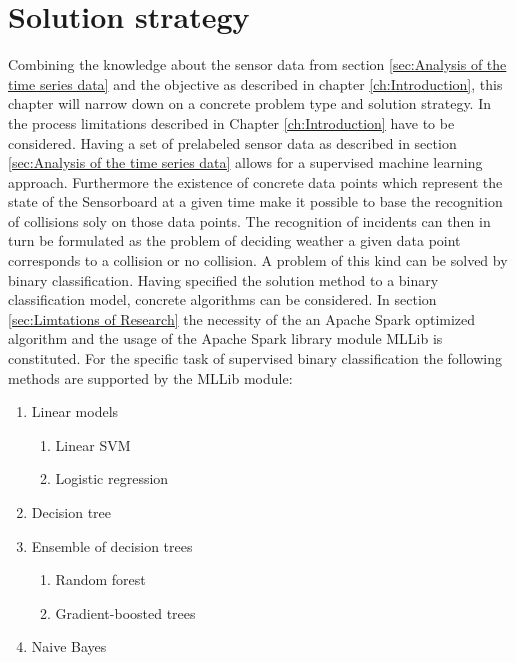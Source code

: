\section{Solution strategy}
\label{sec:Solution strategy}
Combining the knowledge about the sensor data from section \ref{sec:Analysis of the time series data} and the objective as described in chapter \ref{ch:Introduction}, this chapter will narrow down on a concrete problem type and solution strategy. In the process limitations described in Chapter \ref{ch:Introduction} have to be considered. \newline
Having a set of prelabeled sensor data as described in section \ref{sec:Analysis of the time series data} allows for a supervised machine learning approach.  Furthermore the existence of concrete data points which represent the state of the Sensorboard at a given time make it possible to base the recognition of collisions soly on those data points. The recognition of incidents can then in turn be formulated as the problem of deciding weather a given data point corresponds to a collision or no collision. A problem of this kind can be solved by binary classification. \newline
Having specified the solution method to a binary classification model, concrete algorithms can be considered. In section \ref{sec:Limtations of Research}  the necessity of the an Apache Spark optimized algorithm and the usage of the Apache Spark library module MLLib is constituted. For the specific task of supervised binary classification the following methods are supported by the MLLib module:
\begin{enumerate}
\item Linear models
\begin{enumerate}
\item Linear SVM
\item Logistic regression
\end{enumerate}
\item Decision tree
\item Ensemble of decision trees
\begin{enumerate}
\item Random forest
\item Gradient-boosted trees
\end{enumerate}
\item Naive Bayes

\end{enumerate}

